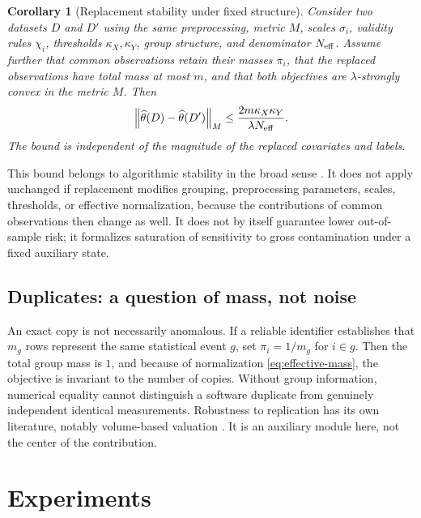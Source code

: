 \documentclass[10pt,a4paper]{article}
\newtheorem{corollary}[theorem]{Corollary}
\newcommand{\norm}[1]{\left\lVert #1\right\rVert}
\begin{document}
\begin{corollary}[Replacement stability under fixed structure]
Consider two datasets $D$ and $D'$ using the same preprocessing, metric $M$, scales $\sigma_i$, validity rules $\chi_i$, thresholds $\kappa_X,\kappa_Y$, group structure, and denominator $N_{\rm eff}$. Assume further that common observations retain their masses $\pi_i$, that the replaced observations have total mass at most $m$, and that both objectives are $\lambda$-strongly convex in the metric $M$. Then
\begin{equation}
\norm{\widehat\theta(D)-\widehat\theta(D')}_M
\leq
\frac{2m\kappa_X\kappa_Y}{\lambda N_{\rm eff}}.
\label{eq:replacement-stability}
\end{equation}
The bound is independent of the magnitude of the replaced covariates and labels.
\end{corollary}

This bound belongs to algorithmic stability in the broad sense \citep{bousquet2002}. It does not apply unchanged if replacement modifies grouping, preprocessing parameters, scales, thresholds, or effective normalization, because the contributions of common observations then change as well. It does not by itself guarantee lower out-of-sample risk; it formalizes saturation of sensitivity to gross contamination under a fixed auxiliary state.

\subsection{Duplicates: a question of mass, not noise}
An exact copy is not necessarily anomalous. If a reliable identifier establishes that $m_g$ rows represent the same statistical event $g$, set $\pi_i=1/m_g$ for $i\in g$. Then the total group mass is $1$, and because of normalization \eqref{eq:effective-mass}, the objective is invariant to the number of copies. Without group information, numerical equality cannot distinguish a software duplicate from genuinely independent identical measurements. Robustness to replication has its own literature, notably volume-based valuation \citep{xu2021volume}. It is an auxiliary module here, not the center of the contribution.

\section{Experiments}
\label{sec:experiments}
\end{document}
